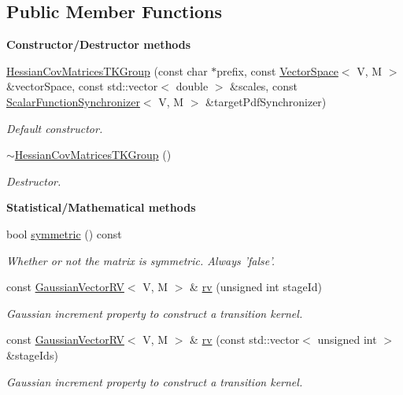 \subsection*{Public Member Functions}
\begin{Indent}{\bf Constructor/\-Destructor methods}\par
\begin{DoxyCompactItemize}
\item 
\hyperlink{class_q_u_e_s_o_1_1_hessian_cov_matrices_t_k_group_a130c5c8e70e348350a12bd8d8a207fd4}{Hessian\-Cov\-Matrices\-T\-K\-Group} (const char $\ast$prefix, const \hyperlink{class_q_u_e_s_o_1_1_vector_space}{Vector\-Space}$<$ V, M $>$ \&vector\-Space, const std\-::vector$<$ double $>$ \&scales, const \hyperlink{class_q_u_e_s_o_1_1_scalar_function_synchronizer}{Scalar\-Function\-Synchronizer}$<$ V, M $>$ \&target\-Pdf\-Synchronizer)
\begin{DoxyCompactList}\small\item\em Default constructor. \end{DoxyCompactList}\item 
\hyperlink{class_q_u_e_s_o_1_1_hessian_cov_matrices_t_k_group_a7d5732bbedaebfc7b63ccbb11ea2c1b6}{$\sim$\-Hessian\-Cov\-Matrices\-T\-K\-Group} ()
\begin{DoxyCompactList}\small\item\em Destructor. \end{DoxyCompactList}\end{DoxyCompactItemize}
\end{Indent}
\begin{Indent}{\bf Statistical/\-Mathematical methods}\par
\begin{DoxyCompactItemize}
\item 
bool \hyperlink{class_q_u_e_s_o_1_1_hessian_cov_matrices_t_k_group_abf0f6a04543c18b2f95e615b09191c2b}{symmetric} () const 
\begin{DoxyCompactList}\small\item\em Whether or not the matrix is symmetric. Always 'false'. \end{DoxyCompactList}\item 
const \hyperlink{class_q_u_e_s_o_1_1_gaussian_vector_r_v}{Gaussian\-Vector\-R\-V}$<$ V, M $>$ \& \hyperlink{class_q_u_e_s_o_1_1_hessian_cov_matrices_t_k_group_a7a9a6fabad72d063438733436704ff2b}{rv} (unsigned int stage\-Id)
\begin{DoxyCompactList}\small\item\em Gaussian increment property to construct a transition kernel. \end{DoxyCompactList}\item 
const \hyperlink{class_q_u_e_s_o_1_1_gaussian_vector_r_v}{Gaussian\-Vector\-R\-V}$<$ V, M $>$ \& \hyperlink{class_q_u_e_s_o_1_1_hessian_cov_matrices_t_k_group_a658ecfbd10f11f4951649986ad65ae76}{rv} (const std\-::vector$<$ unsigned int $>$ \&stage\-Ids)
\begin{DoxyCompactList}\small\item\em Gaussian increment property to construct a transition kernel. \end{DoxyCompactList}\end{DoxyCompactItemize}
\end{Indent}
